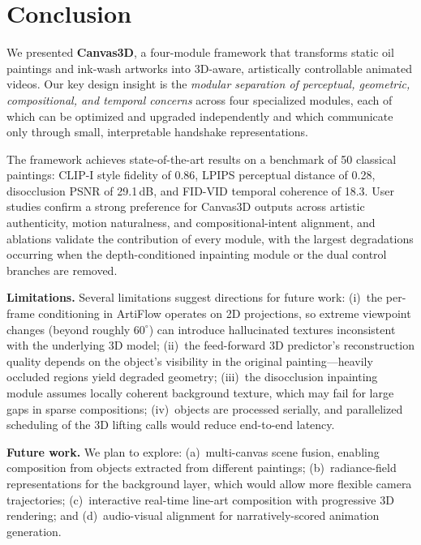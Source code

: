\section{Conclusion}
\label{sec:conclusion}

We presented \textbf{Canvas3D}, a four-module framework that transforms static
oil paintings and ink-wash artworks into 3D-aware, artistically controllable
animated videos. Our key design insight is the \emph{modular separation of
perceptual, geometric, compositional, and temporal concerns} across four
specialized modules, each of which can be optimized and upgraded independently
and which communicate only through small, interpretable handshake
representations.

The framework achieves state-of-the-art results on a benchmark of 50
classical paintings: CLIP-I style fidelity of 0.86, LPIPS perceptual
distance of 0.28, disocclusion PSNR of 29.1\,dB, and FID-VID temporal
coherence of 18.3. User studies confirm a strong preference for
Canvas3D outputs across artistic authenticity, motion naturalness, and
compositional-intent alignment, and ablations validate the contribution
of every module, with the largest degradations occurring when the
depth-conditioned inpainting module or the dual control branches are
removed.

\smallskip
\noindent\textbf{Limitations.}
Several limitations suggest directions for future work:
(i)~the per-frame conditioning in ArtiFlow operates on 2D projections,
so extreme viewpoint changes (beyond roughly $60^\circ$) can introduce
hallucinated textures inconsistent with the underlying 3D model;
(ii)~the feed-forward 3D predictor's reconstruction quality depends on
the object's visibility in the original painting---heavily occluded
regions yield degraded geometry;
(iii)~the disocclusion inpainting module assumes locally coherent
background texture, which may fail for large gaps in sparse
compositions;
(iv)~objects are processed serially, and parallelized scheduling of
the 3D lifting calls would reduce end-to-end latency.

\smallskip
\noindent\textbf{Future work.}
We plan to explore: (a)~multi-canvas scene fusion, enabling composition
from objects extracted from different paintings; (b)~radiance-field
representations for the background layer, which would allow more
flexible camera trajectories; (c)~interactive real-time line-art
composition with progressive 3D rendering; and (d)~audio-visual
alignment for narratively-scored animation generation.

